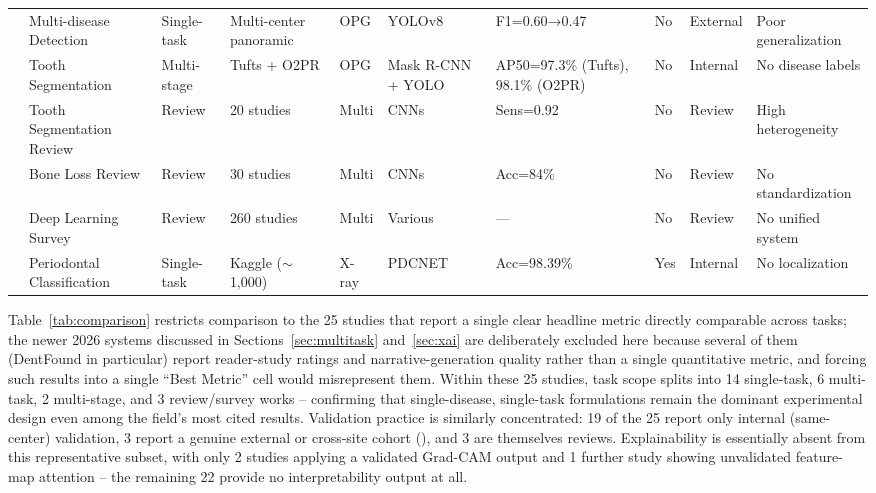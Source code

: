 \documentclass[conference]{IEEEtran}
\begin{document}
\begin{table}[t]
\begin{tabular}{p{0.5cm} p{2.0cm} p{1.3cm} p{2.2cm} p{1.1cm} p{2.4cm} p{1.6cm} p{0.6cm} p{1.3cm} p{2.2cm}}
\cite{muresanu2024automating}    & Multi-disease Detection      & Single-task & Multi-center panoramic          & OPG      & YOLOv8                  & F1=0.60→0.47     & No      & External & Poor generalization \\
\cite{zhang2025reliable}         & Tooth Segmentation           & Multi-stage & Tufts + O2PR                    & OPG      & Mask R-CNN + YOLO       & AP50=97.3\% (Tufts), 98.1\% (O2PR) & No & Internal & No disease labels \\
\cite{bonfanti2025deep}          & Tooth Segmentation Review    & Review      & 20 studies                      & Multi    & CNNs                    & Sens=0.92        & No      & Review   & High heterogeneity \\
\cite{khubrani2025detection}     & Bone Loss Review             & Review      & 30 studies                      & Multi    & CNNs                    & Acc=84\%         & No      & Review   & No standardization \\
\cite{zhou2025deep}              & Deep Learning Survey         & Review      & 260 studies                     & Multi    & Various                 & ---              & No      & Review   & No unified system \\
\cite{bilal2024pdcnet}           & Periodontal Classification   & Single-task & Kaggle ($\sim$1,000)            & X-ray    & PDCNET                  & Acc=98.39\%      & Yes     & Internal & No localization \\
\end{tabular}
\end{table}

Table~\ref{tab:comparison} restricts comparison to the 25 studies that
report a single clear headline metric directly comparable across
tasks; the newer 2026 systems discussed in Sections~\ref{sec:multitask}
and~\ref{sec:xai} are deliberately excluded here because several of
them (DentFound in particular) report reader-study ratings and
narrative-generation quality rather than a single quantitative metric,
and forcing such results into a single ``Best Metric'' cell would
misrepresent them. Within these 25 studies, task scope splits into 14
single-task, 6 multi-task, 2 multi-stage, and 3 review/survey works --
confirming that single-disease, single-task formulations remain the
dominant experimental design even among the field's most cited
results. Validation practice is similarly concentrated: 19 of the 25
report only internal (same-center) validation, 3 report a genuine
external or cross-site cohort
(\cite{perez2024ai,bizjak2024advancing,muresanu2024automating}), and 3
are themselves reviews. Explainability is essentially absent from this
representative subset, with only 2 studies applying a validated
Grad-CAM output and 1 further study showing unvalidated feature-map
attention -- the remaining 22 provide no interpretability output at
all.
\end{document}
